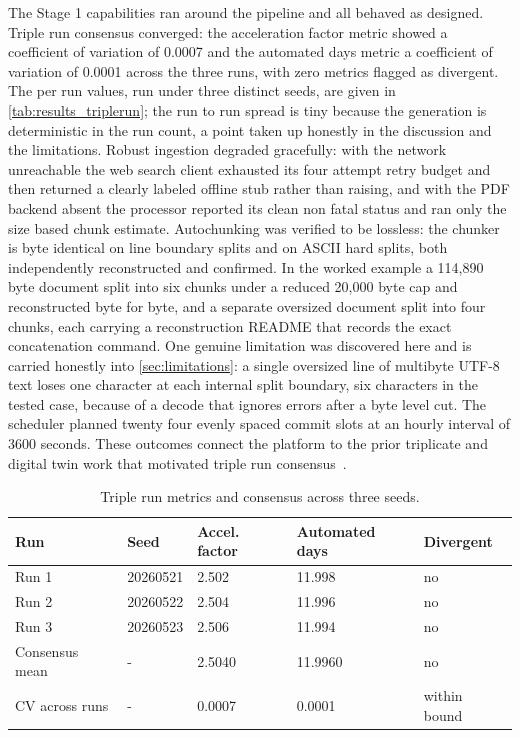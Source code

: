 The Stage 1 capabilities ran around the pipeline and all behaved as designed.
Triple run consensus converged: the acceleration factor metric showed a
coefficient of variation of 0.0007 and the automated days metric a coefficient of
variation of 0.0001 across the three runs, with zero metrics flagged as
divergent. The per run values, run under three distinct seeds, are given in
\autoref{tab:results_triplerun}; the run to run spread is tiny because the
generation is deterministic in the run count, a point taken up honestly in the
discussion and the limitations. Robust ingestion degraded gracefully: with the network unreachable the
web search client exhausted its four attempt retry budget and then returned a
clearly labeled offline stub rather than raising, and with the PDF backend absent
the processor reported its clean non fatal status and ran only the size based
chunk estimate. Autochunking was verified to be lossless: the chunker is byte
identical on line boundary splits and on ASCII hard splits, both independently
reconstructed and confirmed. In the worked example a 114{,}890 byte document
split into six chunks under a reduced 20{,}000 byte cap and reconstructed byte for
byte, and a separate oversized document split into four chunks, each carrying a
reconstruction README that records the exact concatenation command. One genuine limitation was discovered here and is
carried honestly into \autoref{sec:limitations}: a single oversized line of
multibyte UTF-8 text loses one character at each internal split boundary, six
characters in the tested case, because of a decode that ignores errors after a
byte level cut. The scheduler planned twenty four evenly spaced commit slots at
an hourly interval of 3600 seconds. These outcomes connect the platform to the
prior triplicate and digital twin work that motivated triple run
consensus~\cite{kawchak2025pdactwin}.

\begin{table}[H]
\caption{Triple run metrics and consensus across three seeds.}
\label{tab:results_triplerun}
\centering
\begin{tabularx}{\textwidth}{L{2.8cm} C{2.8cm} C{3.0cm} C{3.0cm} >{\raggedright\arraybackslash}X}
\toprule
\textbf{Run} & \textbf{Seed} & \textbf{Accel. factor} & \textbf{Automated days} & \textbf{Divergent} \\
\midrule
  Run 1          & 20260521 & 2.502  & 11.998  & no \\
  Run 2          & 20260522 & 2.504  & 11.996  & no \\
  Run 3          & 20260523 & 2.506  & 11.994  & no \\
  \midrule
  Consensus mean & -        & 2.5040 & 11.9960 & no \\
  CV across runs & -        & 0.0007 & 0.0001  & within bound \\
\bottomrule
\end{tabularx}
\end{table}

